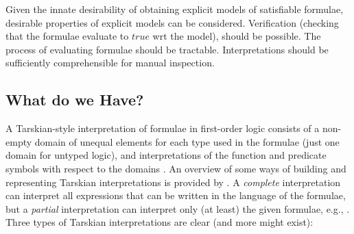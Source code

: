 \documentclass{easychair}
\begin{document}
Given the innate desirability of obtaining explicit models of satisfiable formulae, desirable
properties of explicit models can be considered.
Verification (checking that the formulae evaluate to $true$ wrt the model), should be possible.
The process of evaluating formulae should be tractable.
Interpretations should be sufficiently comprehensible for manual inspection.

\subsection{What do we Have?}
\label{Have}

A Tarskian-style interpretation \cite{TV56} of formulae in first-order logic consists of a 
non-empty domain of unequal elements for each type used in the formulae (just one domain for 
untyped logic), and interpretations of the function and predicate symbols with respect to the 
domains \cite{Hun96,Gal15}.
An overview of some ways of building and representing Tarskian interpretations is provided 
by \cite{CLP04}.
A {\em complete} interpretation can interpret all expressions that can be written in the language 
of the formulae, but a {\em partial} interpretation can interpret only (at least) the 
given formulae, e.g., \cite{BSW23}.
Three types of Tarskian interpretations are clear (and more might exist):
\end{document}
